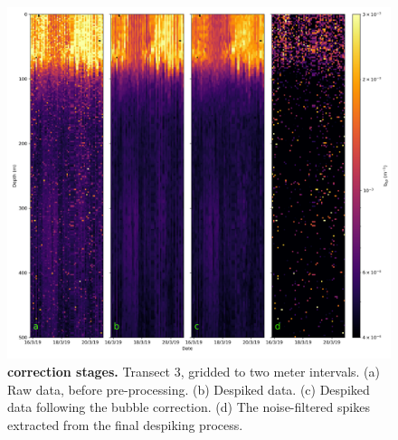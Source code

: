 \documentclass[
	a4paper, %
	10pt, %
	unnumberedsections, %
	twoside, %
]{LTJournalArticle}
\begin{document}
\begin{figure}[H] 
	\includegraphics[width=\linewidth]{Louis/figures/figureE.png}
	\caption{ \textbf{correction stages.}  Transect 3, gridded to two meter intervals. (a) Raw data, before pre-processing. (b) Despiked data. (c) Despiked data following the bubble correction. (d) The noise-filtered spikes extracted from the final despiking process.}
	\label{fig:E}
\end{figure}
\newpage
\end{document}
